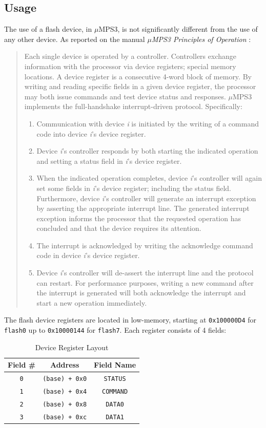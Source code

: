 \documentclass[12pt,a4paper,openright,twoside]{report}
\begin{document}
\subsection{Usage}
The use of a flash device, in $\mu$MPS3, is not significantly different from the use of any other device. As reported on the manual \textit{$\mu$MPS3 Principles of Operation} \cite{pops}:
\begin{quote}
	Each single device is operated by a controller.
	Controllers exchange information with the processor via device registers; special memory locations.
	A device register is a consecutive 4-word block of memory.
	By writing and reading specific fields in a given device register, the processor may both issue commands and test device status and responses.
	$\mu$MPS3 implements the full-handshake interrupt-driven protocol.
	Specifically:
	\begin{enumerate}
		\item Communication with device \textit{i} is initiated by the writing of a command code into device \textit{i}'s device register.
		\item Device \textit{i}'s controller responds by both starting the indicated operation and setting a status field in \textit{i}'s device register.
		\item When the indicated operation completes, device \textit{i}'s controller will again set some fields in \textit{i}'s device register; including the status field.
		      Furthermore, device \textit{i}'s controller will generate an interrupt exception by asserting the appropriate interrupt line.
		      The generated interrupt exception informs the processor that the requested operation has concluded and that the device requires its attention.
		\item The interrupt is acknowledged by writing the acknowledge command code in device \textit{i}'s device register.
		\item Device \textit{i}'s controller will de-assert the interrupt line and the protocol can restart.
		      For performance purposes, writing a new command after the interrupt is generated will both acknowledge the interrupt and start a new operation immediately.
	\end{enumerate}
\end{quote}
The flash device registers are located in low-memory, starting at \texttt{0x100000D4} for \texttt{flash0} up to \texttt{0x10000144} for \texttt{flash7}.
Each register consists of 4 fields:
\begin{table}[h]
	\centering
	\begin{tabular}{c|c|c}
		Field \#   & Address               & Field Name       \\  \hline\hline
		\texttt{0} & \texttt{(base) + 0x0} & \texttt{STATUS}  \\ \hline
		\texttt{1} & \texttt{(base) + 0x4} & \texttt{COMMAND} \\ \hline
		\texttt{2} & \texttt{(base) + 0x8} & \texttt{DATA0}   \\ \hline
		\texttt{3} & \texttt{(base) + 0xc} & \texttt{DATA1}
	\end{tabular}
	\caption{Device Register Layout}
	\label{tab:device_register_layout}
\end{table}
\end{document}
